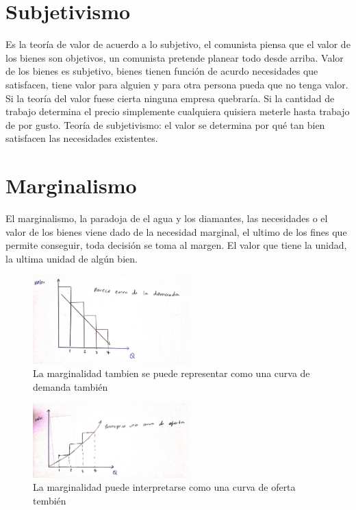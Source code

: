 \section{Subjetivismo}
Es la teoría de valor de acuerdo a lo subjetivo, el comunista piensa que el valor de los bienes son objetivos, un comunista pretende planear todo desde arriba. \newline 
Valor de los bienes es subjetivo, bienes tienen función de acurdo necesidades que satisfacen, tiene valor para alguien y para otra persona pueda que no tenga valor. Si la teoría del valor fuese cierta ninguna empresa quebraría. Si la cantidad de trabajo determina el precio simplemente cualquiera quisiera meterle hasta trabajo de por gusto. \newline 
Teoría de subjetivismo: el valor se determina por qué tan bien satisfacen las necesidades existentes.

\section{Marginalismo}
El marginalismo, la paradoja de el agua y los diamantes, las necesidades o el valor de los bienes viene dado de la necesidad marginal, el ultimo de los fines que permite conseguir, toda decisión se toma al margen. El valor que tiene la unidad, la ultima unidad de algún bien.

\begin{center}
    \begin{figure}[htbp]
        \centering
        \includegraphics[width=6cm,angle=90]{Classes/Images/2019-07-24-1.jpg}
        \caption{La marginalidad tambien se puede representar como una curva de demanda también}
        \label{fig1}
    \end{figure}
\end{center}

\begin{center}
    \begin{figure}[htbp]
        \centering
        \includegraphics[width=6cm,angle=90]{Classes/Images/2019-07-24-2.jpg}
        \caption{La marginalidad puede interpretarse como una curva de oferta tembién}
        \label{fig2}
    \end{figure}
\end{center}




